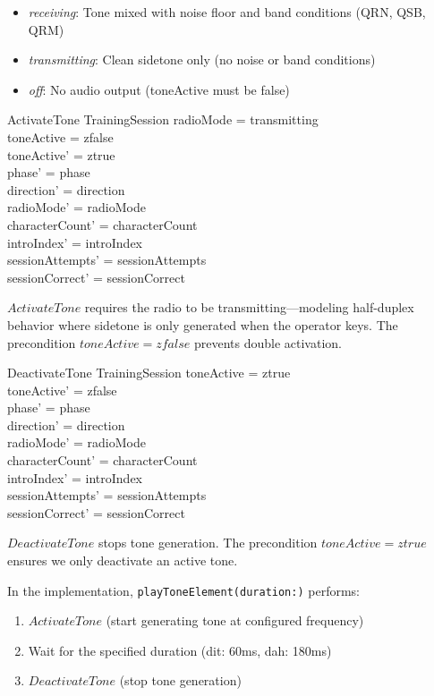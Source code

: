 \documentclass[a4paper,10pt,fleqn]{article}
\begin{document}
\begin{itemize}
\item \emph{receiving}: Tone mixed with noise floor and band conditions (QRN, QSB, QRM)
\item \emph{transmitting}: Clean sidetone only (no noise or band conditions)
\item \emph{off}: No audio output (toneActive must be false)
\end{itemize}

\begin{schema}{ActivateTone}
\Delta TrainingSession
\where
radioMode = transmitting \\
toneActive = zfalse \\
toneActive' = ztrue \\
phase' = phase \\
direction' = direction \\
radioMode' = radioMode \\
characterCount' = characterCount \\
introIndex' = introIndex \\
sessionAttempts' = sessionAttempts \\
sessionCorrect' = sessionCorrect
\end{schema}

$ActivateTone$ requires the radio to be transmitting---modeling half-duplex
behavior where sidetone is only generated when the operator keys.
The precondition $toneActive = zfalse$ prevents double activation.

\begin{schema}{DeactivateTone}
\Delta TrainingSession
\where
toneActive = ztrue \\
toneActive' = zfalse \\
phase' = phase \\
direction' = direction \\
radioMode' = radioMode \\
characterCount' = characterCount \\
introIndex' = introIndex \\
sessionAttempts' = sessionAttempts \\
sessionCorrect' = sessionCorrect
\end{schema}

$DeactivateTone$ stops tone generation. The precondition $toneActive = ztrue$
ensures we only deactivate an active tone.

In the implementation, \texttt{playToneElement(duration:)} performs:
\begin{enumerate}
\item $ActivateTone$ (start generating tone at configured frequency)
\item Wait for the specified duration (dit: 60ms, dah: 180ms)
\item $DeactivateTone$ (stop tone generation)
\end{enumerate}
\end{document}
